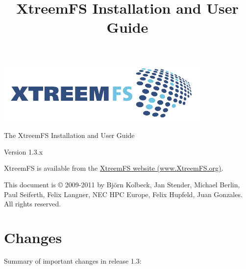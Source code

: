 \documentclass[a4paper,10pt]{book}
\title{XtreemFS Installation and User Guide}
\begin{document}
\begin{titlepage}
\begin{flushright}
 \includegraphics{images/final_logo.pdf}
\end{flushright}

\vspace{3cm}

\begin{flushleft}
\sffamily \begin{LARGE}The XtreemFS Installation and User Guide\end{LARGE}

Version 1.3.x
\end{flushleft}


\end{titlepage}
\garamond
XtreemFS is available from the \href{http://www.XtreemFS.org}{XtreemFS website (www.XtreemFS.org)}.


This document is \copyright{} 2009-2011 by Bj\"orn Kolbeck, Jan Stender, Michael Berlin, Paul Seiferth, Felix Langner, NEC HPC Europe, Felix Hupfeld, Juan Gonzales. All rights reserved.

\setcounter{tocdepth}{10}
\tableofcontents

\chapter*{Changes}
Summary of important changes in release 1.3:
\end{document}
